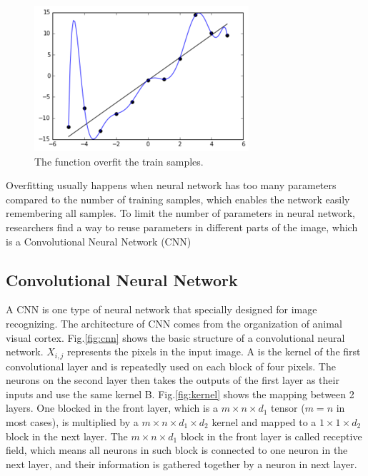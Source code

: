 \begin{figure}[H]
  \centering
  \includegraphics[width=.7\linewidth]{figures/overfit.png}
  \caption{The function overfit the train samples.}
  \label{fig:overfit}
\end{figure}

Overfitting usually happens when neural network has too many parameters compared to the number of training samples, which enables the network easily remembering all samples. To limit the number of parameters in neural network, researchers find a way to reuse parameters in different parts of the image, which is a Convolutional Neural Network (CNN)

\subsection{Convolutional Neural Network}

A CNN is one type of neural network that specially designed for image recognizing. The architecture of CNN comes from the organization of animal visual cortex. Fig.\ref{fig:cnn} shows the basic structure of a convolutional neural network. $X_{i,j}$ represents the pixels in the input image. A is the kernel of the first convolutional layer and is repeatedly used on each block of four pixels. The neurons on the second layer then takes the outputs of the first layer as their inputs and use the same kernel B. Fig.\ref{fig:kernel} shows the mapping between 2 layers. One blocked in the front layer, which is a  $m \times n \times d_1$ tensor ($m = n$ in most cases), is multiplied by a $m \times n \times d_1 \times d_2$ kernel and mapped to a $1 \times 1 \times d_2$ block in the next layer. The $m \times n \times d_1$ block in the front layer is called receptive field, which means all neurons in such block is connected to one neuron in the next layer, and their information is gathered together by a neuron in next layer.

